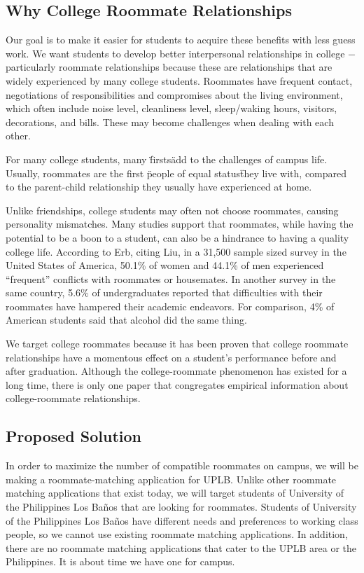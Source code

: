 \documentclass[journal]{./IEEE/IEEEtran}
\newcommand{\UPLB}{University of the Philippines Los Ba\~{n}os }
\begin{document}
    \subsection{Why College Roommate Relationships}
    Our goal is to make it easier for students to acquire these benefits with less guess work. We want students to develop better interpersonal relationships in college $-$ particularly roommate relationships because these are relationships that are widely experienced by many college students\cite{erb}. Roommates have frequent contact, negotiations of responsibilities and compromises about the living environment, which often include noise level, cleanliness level, sleep/waking hours, visitors, decorations, and bills\cite{erb}. These may become challenges when dealing with each other.

    For many college students, many \"firsts\" add to the challenges of campus life. Usually, roommates are the first \"people of equal status\" they live with, compared to the parent-child relationship they usually have experienced at home\cite{erb}.

    Unlike friendships, college students may often not choose roommates, causing personality mismatches. Many studies support that roommates, while having the potential to be a boon to a student, can also be a hindrance to having a quality college life. According to Erb\cite{erb}, citing Liu\cite{liu}, in a 31,500 sample sized survey in the United States of America, 50.1\% of women and 44.1\% of men experienced “frequent” conflicts with roommates or housemates. In another survey in the same country, 5.6\% of undergraduates reported that difficulties with their roommates have hampered their academic endeavors\cite{erb}. For comparison, 4\% of American students said that alcohol did the same thing\cite{erb}.

    We target college roommates because it has been proven that college roommate relationships have a momentous effect on a student's performance before and after graduation. Although the college-roommate phenomenon has existed for a long time, there is only one paper that congregates empirical information about college-roommate relationships\cite{erb}.

    \subsection{Proposed Solution}
    In order to maximize the number of compatible roommates on campus, we will be making a roommate-matching application for UPLB. Unlike other roommate matching applications that exist today, we will target students of \UPLB that are looking for roommates. Students of \UPLB  have different needs and preferences to working class people, so we cannot use existing roommate matching applications. In addition, there are no roommate matching applications that cater to the UPLB area or the Philippines. It is about time we have one for campus.
\pubidadjcol
\end{document}
